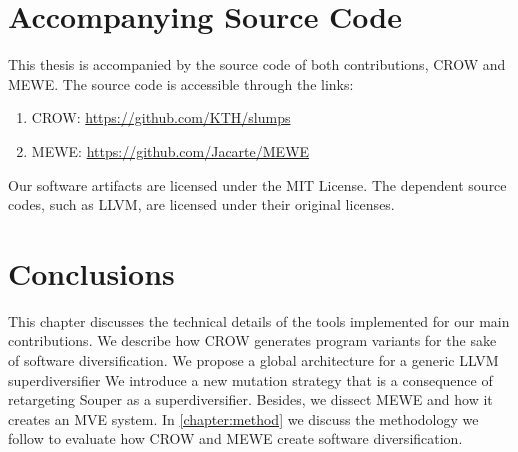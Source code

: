 


\section{Accompanying Source Code}

This thesis is accompanied by the source code of both contributions, CROW and MEWE. The source code is accessible through the links:
\begin{enumerate}
    \item CROW: \url{https://github.com/KTH/slumps}
    \item MEWE: \url{https://github.com/Jacarte/MEWE}
\end{enumerate}

Our software artifacts are licensed under the MIT License. The dependent source codes, such as LLVM, are licensed under their original licenses.

\section*{Conclusions}

This chapter discusses the technical details of the tools implemented for our main contributions.
We describe how CROW generates program variants for the sake of software diversification.
We propose a global architecture for a generic LLVM superdiversifier
We introduce a new mutation strategy that is a consequence of retargeting Souper as a superdiversifier.
Besides, we dissect MEWE and how it creates an MVE system.
In \autoref{chapter:method} we discuss the methodology we follow to evaluate how CROW and MEWE create software diversification.
